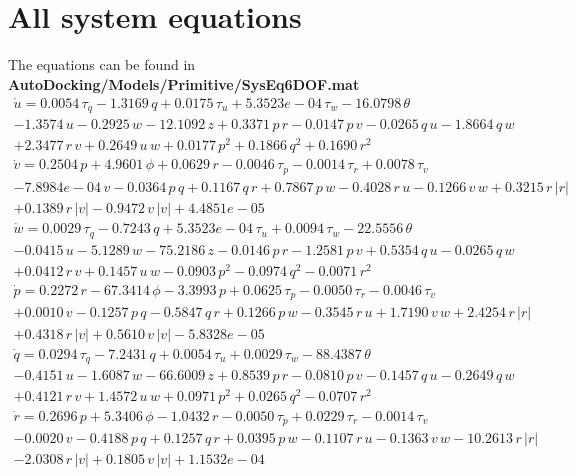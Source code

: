 \documentclass[12pt,a4]{article}
\begin{document}
\section{All system equations}
The equations can be found in \textbf{AutoDocking/Models/Primitive/SysEq6DOF.mat}
\begin{multline}
	\dot{u} = 0.0054\,\tau _{q}-1.3169\,q+0.0175\,\tau _{u}+5.3523e-04\,\tau _{w}-16.0798\,\theta \\-1.3574\,u-0.2925\,w-12.1092\,z+0.3371\,p\,r-0.0147\,p\,v-0.0265\,q\,u-1.8664\,q\,w\\+2.3477\,r\,v+0.2649\,u\,w+0.0177\,p^2+0.1866\,q^2+0.1690\,r^2
\end{multline}
\begin{multline}
	\dot{v} = 0.2504\,p+4.9601\,\phi +0.0629\,r-0.0046\,\tau _{p}-0.0014\,\tau _{r}+0.0078\,\tau _{v}\\-7.8984e-04\,v-0.0364\,p\,q+0.1167\,q\,r+0.7867\,p\,w-0.4028\,r\,u-0.1266\,v\,w+0.3215\,r\,\left|r\right|\\+0.1389\,r\,\left|v\right|-0.9472\,v\,\left|v\right|+4.4851e-05
\end{multline}
\begin{multline}
	\dot{w} = 0.0029\,\tau _{q}-0.7243\,q+5.3523e-04\,\tau _{u}+0.0094\,\tau _{w}-22.5556\,\theta \\-0.0415\,u-5.1289\,w-75.2186\,z-0.0146\,p\,r-1.2581\,p\,v+0.5354\,q\,u-0.0265\,q\,w\\+0.0412\,r\,v+0.1457\,u\,w-0.0903\,p^2-0.0974\,q^2-0.0071\,r^2
\end{multline}
\begin{multline}
	\dot{p} = 0.2272\,r-67.3414\,\phi -3.3993\,p+0.0625\,\tau _{p}-0.0050\,\tau _{r}-0.0046\,\tau _{v}\\+0.0010\,v-0.1257\,p\,q-0.5847\,q\,r+0.1266\,p\,w-0.3545\,r\,u+1.7190\,v\,w+2.4254\,r\,\left|r\right|\\+0.4318\,r\,\left|v\right|+0.5610\,v\,\left|v\right|-5.8328e-05
\end{multline}
\begin{multline}
	\dot{q} = 0.0294\,\tau _{q}-7.2431\,q+0.0054\,\tau _{u}+0.0029\,\tau _{w}-88.4387\,\theta \\-0.4151\,u-1.6087\,w-66.6009\,z+0.8539\,p\,r-0.0810\,p\,v-0.1457\,q\,u-0.2649\,q\,w\\+0.4121\,r\,v+1.4572\,u\,w+0.0971\,p^2+0.0265\,q^2-0.0707\,r^2
\end{multline}
\begin{multline}
	\dot{r} = 0.2696\,p+5.3406\,\phi -1.0432\,r-0.0050\,\tau _{p}+0.0229\,\tau _{r}-0.0014\,\tau _{v}\\-0.0020\,v-0.4188\,p\,q+0.1257\,q\,r+0.0395\,p\,w-0.1107\,r\,u-0.1363\,v\,w-10.2613\,r\,\left|r\right|\\-2.0308\,r\,\left|v\right|+0.1805\,v\,\left|v\right|+1.1532e-04
\end{multline}
\end{document}
